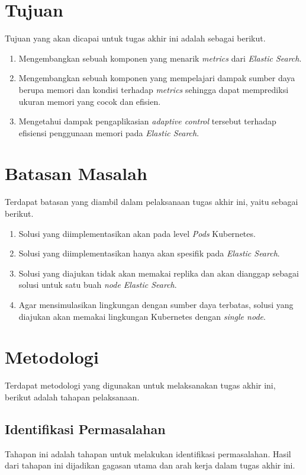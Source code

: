 \section{Tujuan}

Tujuan yang akan dicapai untuk tugas akhir ini adalah sebagai berikut.

\begin{enumerate}
    \item Mengembangkan sebuah komponen yang menarik \textit{metrics} dari \textit{Elastic Search}.

    \item Mengembangkan sebuah komponen yang mempelajari dampak sumber daya berupa memori dan kondisi terhadap \textit{metrics} sehingga dapat memprediksi ukuran memori yang cocok dan efisien.

    \item Mengetahui dampak pengaplikasian \textit{adaptive control} tersebut terhadap efisiensi penggunaan memori pada \textit{Elastic Search}.
\end{enumerate}

\section{Batasan Masalah}

Terdapat batasan yang diambil dalam pelaksanaan tugas akhir ini, yaitu sebagai berikut.

\begin{enumerate}
    \item Solusi yang diimplementasikan akan pada level \textit{Pods} Kubernetes.
    \item Solusi yang diimplementasikan hanya akan spesifik pada \textit{Elastic Search}.
    \item Solusi yang diajukan tidak akan memakai replika dan akan dianggap sebagai solusi untuk satu buah \textit{node Elastic Search}.
    \item Agar mensimulasikan lingkungan dengan sumber daya terbatas, solusi yang diajukan akan memakai lingkungan Kubernetes dengan \textit{single node}.
 \end{enumerate}

\section{Metodologi}

Terdapat metodologi yang digunakan untuk melaksanakan tugas akhir ini, berikut adalah tahapan pelaksanaan.
\subsection{Identifikasi Permasalahan}
Tahapan ini adalah tahapan untuk melakukan identifikasi permasalahan. Hasil dari tahapan ini dijadikan gagasan utama dan arah kerja dalam tugas akhir ini.
